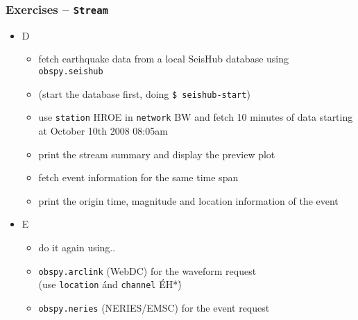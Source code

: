 \documentclass[t,10pt,compress=false,usepdftitle=false]{beamer}
\begin{document}
\begin{frame}[fragile]
    \frametitle{Exercises -- \tt{Stream}}
    \begin{itemize}
    \item D
        \begin{itemize}
        \item fetch earthquake data from a local SeisHub database using \verb#obspy.seishub#
        \item (start the database first, doing \verb#$ seishub-start#)
        \item use \verb#station# HROE in \verb#network# BW and fetch 10 minutes of data starting at October 10th 2008 08:05am
        \item print the stream summary and display the preview plot
        \item fetch event information for the same time span
        \item print the origin time, magnitude and location information of the event
        \end{itemize}
    \end{itemize}
    \vspace*{0.5em}
    \begin{itemize}
    \item<2> E
        \begin{itemize}
        \item<2> do it again using..
        \item<2> \verb#obspy.arclink# (WebDC) for the waveform request\\
                 (use \verb#location# \'\' and \verb#channel# \'EH*\')
        \item<2> \verb#obspy.neries# (NERIES/EMSC) for the event request
        \end{itemize}
    \end{itemize}
\end{frame}

\end{document}
